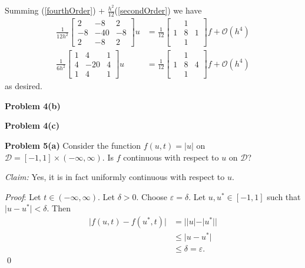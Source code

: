 \documentclass[12pt]{article}
\newcommand{\problem}[1]{\hspace{-4 ex} \large \textbf{Problem #1} }
\renewenvironment{proof}{\hspace{-4 ex} \emph{Proof}:}{\qed}
\begin{document}
Summing (\ref{fourthOrder}) + $\frac{h^2}{12}$(\ref{secondOrder}) we have
\begin{align*}
	\frac{1}{12h^2}\begin{bmatrix}2&-8&2\\-8&-40&-8\\2&-8&2\end{bmatrix}u &= 
	\frac{1}{12}\begin{bmatrix}&1&\\1&8&1\\&1&\end{bmatrix}f + \mathcal{O}(h^4)\\
	\frac{1}{6h^2}\begin{bmatrix}1 & 4 & 1\\4 & -20&4\\1&4&1\end{bmatrix}u &=
	\frac{1}{12}\begin{bmatrix} & 1 & \\1 & 8&4\\&1&\end{bmatrix}f + \mathcal{O}(h^4)
\end{align*}
as desired.

\bigbreak
\problem{4(b)}

\bigbreak
\problem{4(c)}

\bigbreak
\problem{5(a)} Consider the function $f(u,t) = |u|$ on $\mathcal{D}=[-1,1] \times (-\infty, \infty)$. Is $f$ continuous with respect to $u$ on $\mathcal{D}$? \bigbreak

\textit{Claim:} Yes, it is in fact uniformly continuous with respect to $u$. \bigbreak

\begin{proof}
	Let $t \in (-\infty, \infty)$. Let $\delta >0$. Choose $\varepsilon = \delta$. Let $u, u^* \in [-1, 1]$ such that $\vert u - u^* \vert < \delta$. Then 
	\begin{align*}
		\vert f(u, t) - f(u^*,t) \vert &= \big \vert \vert u \vert - \vert u^* \vert \big \vert  \\
		& \leq \vert u - u^* \vert \tag{reverse triangle inequality} \\
		& \leq \delta = \varepsilon.
	\end{align*}
\end{proof}
\end{document}
